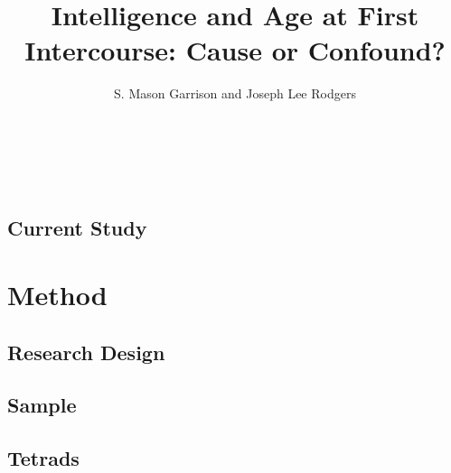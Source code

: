 \documentclass[a4paper,man,apacite,natbib,12pt]{apa6}\usepackage[]{graphicx}\usepackage[]{color}
\title{Intelligence and Age at First Intercourse: Cause or Confound?}
\author{S. Mason Garrison and Joseph Lee Rodgers}
\affiliation{Vanderbilt University}
\begin{document}
\maketitle
%











\section{ }\vspace{-.8cm}
\\


\\

\subsection{Current Study}


\section{Method}
\subsection{Research Design}

%
\subsection{Sample}

%
\subsection{Tetrads}

%
\end{document}

